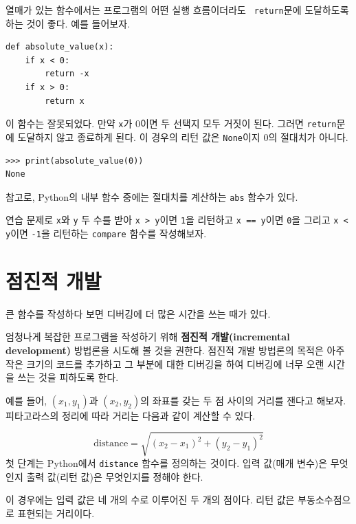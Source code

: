 \documentclass[10pt]{book}
\begin{document}
열매가 있는 함수에서는 프로그램의 어떤 실행 흐름이더라도 {\tt
  return}문에 도달하도록 하는 것이 좋다.  예를 들어보자.

\begin{verbatim}
def absolute_value(x):
    if x < 0:
        return -x
    if x > 0:
        return x
\end{verbatim}
%
이 함수는 잘못되었다.  만약 {\tt x}가 0이면 두 선택지 모두 거짓이
된다.  그러면 {\tt return}문에 도달하지 않고 종료하게 된다.  이 경우의
리턴 값은 {\tt None}이지 0의 절대치가 아니다.

\begin{verbatim}
>>> print(absolute_value(0))
None
\end{verbatim}
%
참고로, Python의 내부 함수 중에는 절대치를 계산하는 {\tt abs} 함수가 있다. 

연습 문제로 {\tt x}와 {\tt y} 두 수를 받아 {\tt x > y}이면 {\tt 1}을
리턴하고 {\tt x == y}이면 {\tt 0}을 그리고 {\tt x < y}이면 {\tt -1}을
리턴하는 {\tt compare} 함수를 작성해보자.


\section{점진적 개발}
\label{incremental.development}

큰 함수를 작성하다 보면 디버깅에 더 많은 시간을 쓰는 때가 있다. 

엄청나게 복잡한 프로그램을 작성하기 위해 {\bf 점진적 개발(incremental
  development)} 방법론을 시도해 볼 것을 권한다.  점진적 개발 방법론의
목적은 아주 작은 크기의 코드를 추가하고 그 부분에 대한 디버깅을 하여
디버깅에 너무 오랜 시간을 쓰는 것을 피하도록 한다.

예를 들어, $(x_1, y_1)$과 $(x_2, y_2)$의 좌표를 갖는 두 점 사이의
거리를 잰다고 해보자.  피타고라스의 정리에 따라 거리는 다음과 같이
계산할 수 있다.

\begin{displaymath}
\mathrm{distance} = \sqrt{(x_2 - x_1)^2 + (y_2 - y_1)^2}
\end{displaymath}
%
첫 단계는 Python에서 {\tt distance} 함수를 정의하는 것이다.  입력
값(매개 변수)은 무엇인지 출력 값(리턴 값)은 무엇인지를 정해야 한다.

이 경우에는 입력 값은 네 개의 수로 이루어진 두 개의 점이다.  리턴 값은
부동소수점으로 표현되는 거리이다.
\end{document}
